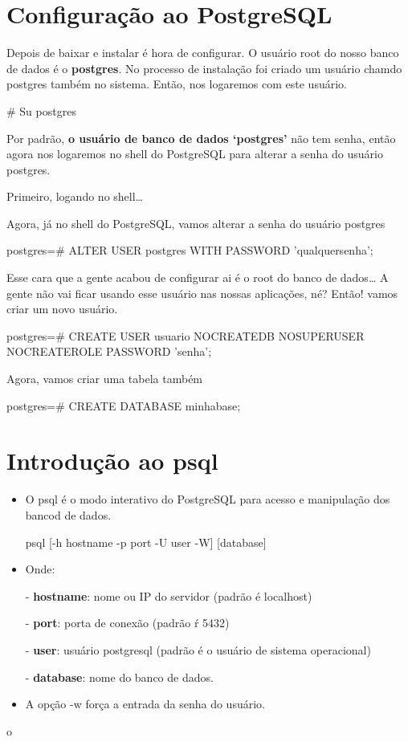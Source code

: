 \section{Configuração ao PostgreSQL}\setcounter{SteP}{1}
Depois de baixar e instalar é hora de configurar. O usuário root do nosso banco de dados é o {\bf postgres}. 
No processo de instalação foi criado um usuário chamdo postgres também no sistema. Então, nos logaremos com este usuário.

\begin{BoxVerbatim}
# Su postgres
\end{BoxVerbatim}
Por padrão, {\bf o usuário de banco de dados ‘postgres’} não tem senha, então agora nos logaremos no shell 
do PostgreSQL para alterar a senha do usuário postgres.

Primeiro, logando no shell…
Agora, já no shell do PostgreSQL, vamos alterar a senha do usuário postgres

\begin{BoxVerbatim}
postgres=# ALTER USER postgres WITH PASSWORD 'qualquersenha';
\end{BoxVerbatim}
Esse cara que a gente acabou de configurar ai é o root do banco de dados… 
A gente não vai ficar usando esse usuário nas nossas aplicações, né? Então! vamos criar um novo usuário.

\begin{BoxVerbatim}
postgres=# CREATE USER usuario NOCREATEDB NOSUPERUSER NOCREATEROLE PASSWORD 
	'senha';
\end{BoxVerbatim}
Agora, vamos criar uma tabela também

\begin{BoxVerbatim}
postgres=# CREATE DATABASE minhabase;
\end{BoxVerbatim}


\section{Introdução ao psql}\setcounter{SteP}{1}
\begin{itemize}
\item{\bf }O psql é o modo interativo do PostgreSQL para acesso e manipulação dos bancod de dados.
\begin{BoxVerbatim}
psql [-h hostname -p port -U user -W] [database]
\end{BoxVerbatim}
\item{\bf }Onde:

- {\bf hostname}: nome ou IP do servidor (padrão é localhost)

- {\bf port}: porta de conexão (padrão ŕ 5432)

- {\bf user}: usuário postgresql (padrão é o usuário de sistema operacional)

- {\bf database}: nome do banco de dados.

\item{\bf } A opção -w força a entrada da senha do usuário.
\end{itemize}o


